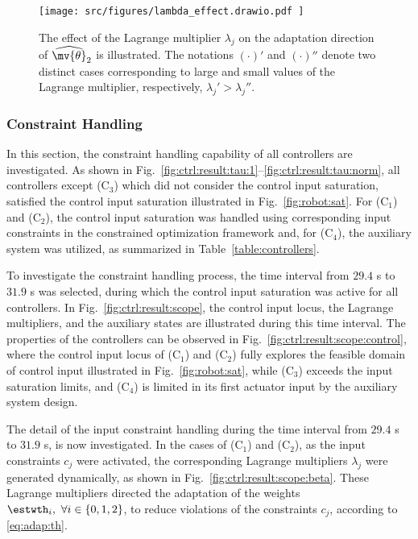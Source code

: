 \documentclass[journal]{IEEEtran}
\begin{document}
\begin{figure}[!t]
	\centering
	\texttt{[image: 
		src/figures/lambda\_effect.drawio.pdf
		]}
	\caption{
        The effect of the Lagrange multiplier $\lambda_{j}$ on the adaptation direction of $\widehat{\mv{\theta}}_2$ is illustrated. 
        The notations $(\cdot)'$ and $(\cdot)''$ denote two distinct cases corresponding to large and small values of the Lagrange multiplier, respectively, \ie $\lambda_{j}' > \lambda_{j}''$.
	}
	\label{fig:lambda_effect}
\end{figure}

\hfill

\subsubsection{Constraint Handling} \label{sec:sim:constraint}

In this section, the constraint handling capability of all controllers are investigated.
As shown in Fig.~\ref{fig:ctrl:result:tau:1}–\ref{fig:ctrl:result:tau:norm}, all controllers except (C$_3$) which did not consider the control input saturation, satisfied the control input saturation illustrated in Fig.~\ref{fig:robot:sat}.
For (C$_1$) and (C$_2$), the control input saturation was handled using corresponding input constraints in the constrained optimization framework and, for (C$_4$), the auxiliary system was utilized, as summarized in Table~\ref{table:controllers}.

To investigate the constraint handling process, the time interval from $29.4$ s to $31.9$ s was selected, during which the control input saturation was active for all controllers.
In Fig.~\ref{fig:ctrl:result:scope}, the control input locus, the Lagrange multipliers, and the auxiliary states are illustrated during this time interval.
The properties of the controllers can be observed in Fig.~\ref{fig:ctrl:result:scope:control}, where the control input locus of (C$_1$) and (C$_2$) fully explores the feasible domain of control input illustrated in Fig.~\ref{fig:robot:sat}, while (C$_3$) exceeds the input saturation limits, and (C$_4$) is limited in its first actuator input by the auxiliary system design.

The detail of the input constraint handling during the time interval from $29.4$ s to $31.9$ s, is now investigated.
In the cases of (C$_1$) and (C$_2$), as the input constraints $c_j$ were activated, the corresponding Lagrange multipliers $\lambda_j$ were generated dynamically, as shown in Fig.~\ref{fig:ctrl:result:scope:beta}.
These Lagrange multipliers directed the adaptation of the weights $\estwth_i,\ \forall i\in\{0,1,2\}$, to reduce violations of the constraints $c_j$, according to \eqref{eq:adap:th}.
\end{document}
